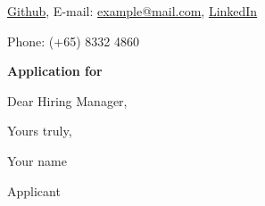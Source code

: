 \documentclass[11pt]{article}
\begin{document}
\href{{https://github.com/}}{\color{blue}Github}, 
E-mail: \href{mailto:{example@mail.com}}{\color{blue}example@mail.com}, 
\href{https://www.linkedin.com}{\color{blue}LinkedIn} 

Phone: (+65) 8332 4860

\textbf{Application for }

Dear Hiring Manager,

\bigskip

\lipsum[1-5]

Yours truly,

Your name

Applicant
\end{document}
